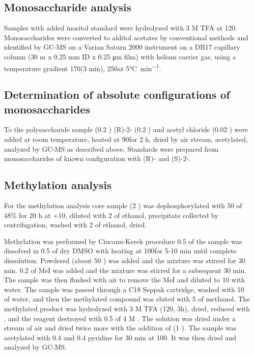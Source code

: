 	\subsection{Monosaccharide analysis} %
	\label{sub:monosaccharide_analysis}

		Samples with added inositol standard were hydrolyzed with 3 M \ac{TFA} at 120\cel. Monosaccharides were converted to alditol acetates by conventional methods and identified by \ac{GC-MS} on a Varian Saturn 2000 instrument on a DB17 capillary column (30 m x 0.25 \si{\milli\meter} ID x 0.25 \si{\micro\meter} film) with helium carrier gas, using a temperature gradient 170\cel (3 min), 250\cel at 5\si{\degreeCelsius\per\minute}.

	\subsection{Determination of absolute configurations of monosaccharides} %
	\label{sub:determination_of_absolute_configurations_of_monosaccharides}

		To the polysaccharide sample (0.2 \milligram) (R)-2- (0.2 \millilitre) and acetyl chloride (0.02 \millilitre) were added at room temperature, heated at 90\cel for 2 h, dried by air stream, acetylated, analyzed by \ac{GC-MS} as described above. Standards were prepared from monosaccharides of known configuration with (R)- and (S)-2-.

	\subsection{Methylation analysis} %
	\label{sub:methylation_analysis}

		For the methylation analysis core sample (2 \milligram) was dephosphorylated with 50 \microlitre of 48\%  for 20 h at +10\cel, diluted with 2 \millilitre of ethanol, precipitate collected by centrifugation, washed with 2 \millilitre of ethanol, dried.

		Methylation was performed by Ciucanu-Kerek procedure 0.5 \milligram of the sample was dissolved in 0.5 \millilitre of dry DMSO with heating at 100\cel for 5-10 min until complete dissolution. Powdered  (about 50 \milligram) was added and the mixture was stirred for 30 min. 0.2 \millilitre of MeI was added and the mixture was stirred for a subsequent 30 min. The sample was then flushed with air to remove the MeI and diluted to 10 \millilitre with water. The sample was passed through a C18 Seppak cartridge, washed with 10 \millilitre of water, and then the methylated compound was eluted with 5 \millilitre of methanol. The methylated product was hydrolyzed with 3 M TFA (120\cel, 3h), dried, reduced with , and the reagent destroyed with 0.5 \millilitre of 4 M . The solution was dried under a stream of air and dried twice more with the addition of  (1 \millilitre). The sample was acetylated with 0.4 \millilitre {} and 0.4 \millilitre pyridine for 30 min at 100\cel. It was then dried and analyzed by \ac{GC-MS}.

